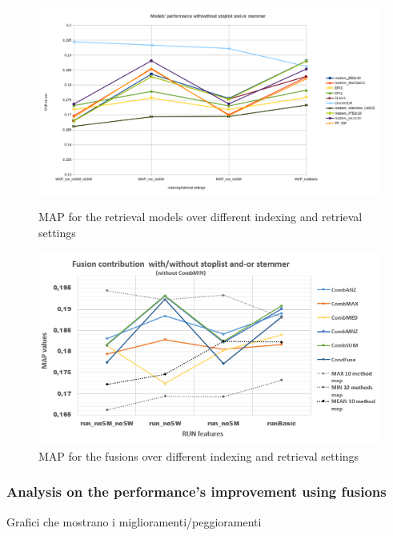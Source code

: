 	\begin{figure}[H]
		\begin{minipage}{0.5\linewidth}
			\centering
			\includegraphics[width=\linewidth]{../eval/results-img-graphs/MAPModSMSW.png}
			\caption{MAP for the retrieval models over different indexing and retrieval settings}				
			\label{fig:MAPMod}
		\end{minipage}
		\begin{minipage}{0.5\linewidth}
			\centering
			\includegraphics[width=\linewidth]{../eval/results-img-graphs/MAPFusSMSW.png}
			\caption{MAP for the fusions over different indexing and retrieval settings}				
			\label{fig:MAPFus}
		\end{minipage}
	\end{figure}

	\subsubsection{Analysis on the performance's improvement using fusions}
	
	Grafici che mostrano i miglioramenti/peggioramenti

